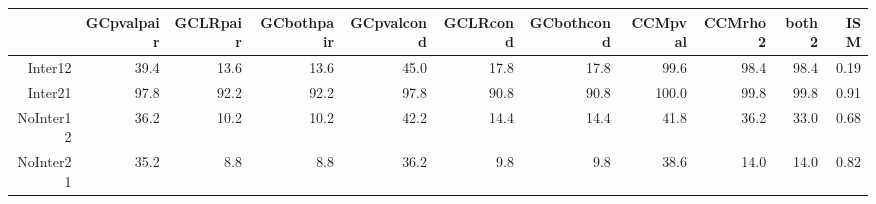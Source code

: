 \begin{table}[ht]
\centering
\begin{tabular}{rrrrrrrrrrr}
  \hline
 & GCpvalpair & GCLRpair & GCbothpair & GCpvalcond & GCLRcond & GCbothcond & CCMpval & CCMrho2 & both2 & ISM \\ 
  \hline
Inter12 & 39.4 & 13.6 & 13.6 & 45.0 & 17.8 & 17.8 & 99.6 & 98.4 & 98.4 & 0.19 \\ 
  Inter21 & 97.8 & 92.2 & 92.2 & 97.8 & 90.8 & 90.8 & 100.0 & 99.8 & 99.8 & 0.91 \\ 
  NoInter12 & 36.2 & 10.2 & 10.2 & 42.2 & 14.4 & 14.4 & 41.8 & 36.2 & 33.0 & 0.68 \\ 
  NoInter21 & 35.2 & 8.8 & 8.8 & 36.2 & 9.8 & 9.8 & 38.6 & 14.0 & 14.0 & 0.82 \\ 
   \hline
\end{tabular}
\end{table}
